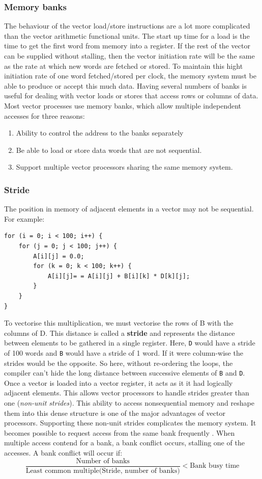 \documentclass[11pt]{article}
\begin{document}
\subsubsection{Memory banks}
The behaviour of the vector load/store instructions are a lot more complicated than the vector arithmetic functional units. The start up time for a load is the time to get the first word from memory into a register. If the rest of the vector can be supplied without stalling, then the vector initiation rate will be the same as the rate at which new words are fetched or stored. 
\n
To maintain this hight initiation rate of one word fetched/stored per clock, the memory system must be able to produce or accept this much data. Having several numbers of banks is useful for dealing with vector loads or stores that access rows or columns of data. Most vector processes use memory banks, which allow multiple independent accesses for three reasons:
\begin{enumerate}
\item Ability to control the address to the banks separately
\item Be able to load or store data words that are not sequential.
\item Support multiple vector processors sharing the same memory system. 
\end{enumerate}

\subsubsection{Stride}
The position in memory of adjacent elements in a vector may not be sequential. For example:
\begin{lstlisting}
for (i = 0; i < 100; i++) {
	for (j = 0; j < 100; j++) {
		A[i][j] = 0.0;
		for (k = 0; k < 100; k++) {
			A[i][j]= = A[i][j] + B[i][k] * D[k][j];
		}
	}
}
\end{lstlisting}
To vectorise this multiplication, we must vectorise the rows of B with the columns of D. This distance is called a \textbf{stride} and represents the distance between elements to be gathered in a single register. Here, \texttt{D} would have a stride of 100 words and \texttt{B} would have a stride of 1 word. If it were column-wise the strides would be the opposite.  So here, without re-ordering the loops, the compiler can't hide the long distance between successive elements of \texttt{B} and \texttt{D}. 
\n
Once a vector is loaded into a vector register, it acts as it it had logically adjacent elements. This allows vector processors to handle strides greater than one (\textit{non-unit strides}). This ability to access nonsequential memory and reshape them into this dense structure is one of the major advantages of vector processors. 
\n
Supporting these non-unit strides complicates the memory system. It becomes possible to request access from the same bank frequently . When multiple access contend for a bank, a bank conflict occurs, stalling one of the accesses. A bank conflict will occur if:
\begin{equation*}
\frac{\text{Number of banks}}{\text{Least common multiple(Stride, number of banks)}} < \text{Bank busy time}
\end{equation*}
\end{document}
